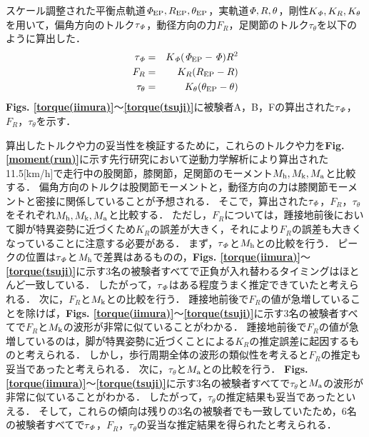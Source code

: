 スケール調整された平衡点軌道${\it \Phi}_{\rm EP},R_{\rm EP},\theta_{\rm EP}$，実軌道${\it \Phi},R,\theta$，剛性$K_{\it \Phi},K_R,K_{\theta}$を用いて，偏角方向のトルク$\tau_{\it \Phi}$，動径方向の力$F_R$，足関節のトルク$\tau_{\theta}$を以下のように算出した．
\begin{eqnarray}
 \label{def_tau1}
 \tau_{\it \Phi} &=& K_{\it \Phi}({\it \Phi}_{\rm EP}-{\it \Phi})R^2 \\
 \label{def_tau2}
 F_R &=& K_R(R_{\rm EP}-R) \\
 \label{def_tau3}
 \tau_{\theta} &=& K_{\theta}(\theta_{\rm EP}-\theta)
\end{eqnarray}
{\bf Figs. \ref{torque(iimura)}}～{\bf \ref{torque(tsuji)}}に被験者A，B，Fの算出された$\tau_{\it \Phi}$，$F_R$，$\tau_{\theta}$を示す．

算出したトルクや力の妥当性を検証するために，これらのトルクや力を{\bf Fig. \ref{moment(run)}}に示す先行研究\cite{Novacheck1998}において逆動力学解析により算出された11.5[km/h]で走行中の股関節，膝関節，足関節のモーメント$M_{\rm h},M_{\rm k},M_{\rm a}$と比較する．
偏角方向のトルクは股関節モーメントと，動径方向の力は膝関節モーメントと密接に関係していることが予想される．
そこで，算出された$\tau_{\it \Phi}$，$F_R$，$\tau_{\theta}$をそれぞれ$M_{\rm h},M_{\rm k},M_{\rm a}$と比較する．
ただし，$F_R$については，踵接地前後において脚が特異姿勢に近づくため$K_R$の誤差が大きく，それにより$F_R$の誤差も大きくなっていることに注意する必要がある．
まず，$\tau_{\it \Phi}$と$M_{\rm h}$との比較を行う．
ピークの位置は$\tau_{\it \Phi}$と$M_{\rm h}$で差異はあるものの，{\bf Figs. \ref{torque(iimura)}}～{\bf \ref{torque(tsuji)}}に示す3名の被験者すべてで正負が入れ替わるタイミングはほとんど一致している．
したがって，$\tau_{\it \Phi}$はある程度うまく推定できていたと考えられる．
次に，$F_R$と$M_{\rm k}$との比較を行う．
踵接地前後で$F_R$の値が急増していることを除けば，{\bf Figs. \ref{torque(iimura)}}～{\bf \ref{torque(tsuji)}}に示す3名の被験者すべてで$F_R$と$M_{\rm k}$の波形が非常に似ていることがわかる．
踵接地前後で$F_R$の値が急増しているのは，脚が特異姿勢に近づくことによる$K_R$の推定誤差に起因するものと考えられる．
しかし，歩行周期全体の波形の類似性を考えると$F_R$の推定も妥当であったと考えられる．
次に，$\tau_{\theta}$と$M_{\rm a}$との比較を行う．
{\bf Figs. \ref{torque(iimura)}}～{\bf \ref{torque(tsuji)}}に示す3名の被験者すべてで$\tau_{\theta}$と$M_{\rm a}$の波形が非常に似ていることがわかる．
したがって，$\tau_{\theta}$の推定結果も妥当であったといえる．
そして，これらの傾向は残りの3名の被験者でも一致していたため，6名の被験者すべてで$\tau_{\it \Phi}$，$F_R$，$\tau_{\theta}$の妥当な推定結果を得られたと考えられる．

